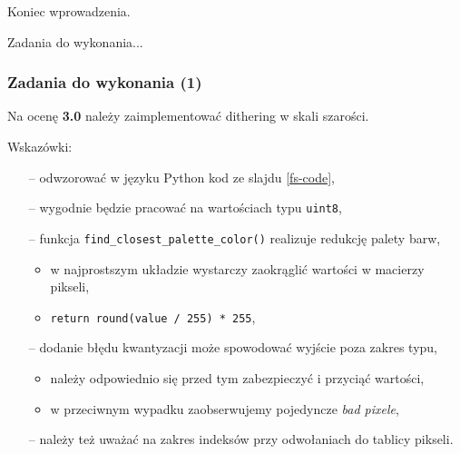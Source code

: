 \documentclass[usenames,dvipsnames,aspectratio=43,presentation]{beamer}
\begin{document}
    \begin{frame}
        Koniec wprowadzenia.

        \vspace{2.0em}

        {
            \Huge
            \color{PWr!50!black}

            Zadania do wykonania...
        }
    \end{frame}


    \begin{frame}
        \frametitle{Zadania do wykonania (1)}
        \footnotesize

        Na ocenę \textbf{3.0} należy zaimplementować dithering w skali szarości.
        
        \vfill
        
        Wskazówki:
        \begin{itemize}
            \setlength{\itemsep}{0.5em}
            \item[--] odwzorować w języku Python kod ze slajdu \ref{fs-code},
            \item[--] wygodnie będzie pracować na wartościach typu \texttt{uint8},
            \item[--] funkcja \texttt{find_closest_palette_color()} realizuje redukcję palety barw,
                      \begin{itemize}
                          \setlength{\itemsep}{0.25em}
                          \scriptsize
                          \item w najprostszym układzie wystarczy zaokrąglić wartości w macierzy pikseli,
                          \item \texttt{return round(value / 255) * 255},
                      \end{itemize}
            \item[--] dodanie błędu kwantyzacji może spowodować wyjście poza zakres typu,
                      \begin{itemize}
                          \setlength{\itemsep}{0.25em}
                          \scriptsize
                          \item należy odpowiednio się przed tym zabezpieczyć i przyciąć wartości,
                          \item w przeciwnym wypadku zaobserwujemy pojedyncze \textit{bad pixele},
                      \end{itemize}
            \item[--] należy też uważać na zakres indeksów przy odwołaniach do tablicy pikseli.
        \end{itemize}
    \end{frame}
\end{document}
